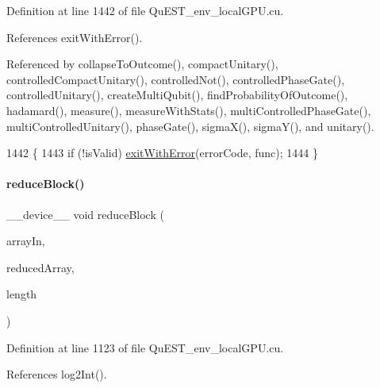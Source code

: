 Definition at line 1442 of file Qu\+E\+S\+T\+\_\+env\+\_\+local\+G\+P\+U.\+cu.



References exit\+With\+Error().



Referenced by collapse\+To\+Outcome(), compact\+Unitary(), controlled\+Compact\+Unitary(), controlled\+Not(), controlled\+Phase\+Gate(), controlled\+Unitary(), create\+Multi\+Qubit(), find\+Probability\+Of\+Outcome(), hadamard(), measure(), measure\+With\+Stats(), multi\+Controlled\+Phase\+Gate(), multi\+Controlled\+Unitary(), phase\+Gate(), sigma\+X(), sigma\+Y(), and unitary().


\begin{DoxyCode}
1442                                                               \{
1443     \textcolor{keywordflow}{if} (!isValid) \mbox{\hyperlink{QuEST__env__localGPU_8cu_ae5f9019826f35e8b51b1716cfe397b45}{exitWithError}}(errorCode, func);
1444 \}
\end{DoxyCode}
\mbox{\label{QuEST__env__localGPU_8cu_a4c740fa3ae25c71c1736790c674bdc98}} 
\paragraph{\texorpdfstring{reduce\+Block()}{reduceBlock()}}
{\footnotesize\ttfamily \+\_\+\+\_\+device\+\_\+\+\_\+ void reduce\+Block (\begin{DoxyParamCaption}\item[{\mbox{\hyperlink{QuEST__precision_8h_a4b654506f18b8bfd61ad2a29a7e38c25}{R\+E\+AL}} $\ast$}]{array\+In,  }\item[{\mbox{\hyperlink{QuEST__precision_8h_a4b654506f18b8bfd61ad2a29a7e38c25}{R\+E\+AL}} $\ast$}]{reduced\+Array,  }\item[{int}]{length }\end{DoxyParamCaption})}



Definition at line 1123 of file Qu\+E\+S\+T\+\_\+env\+\_\+local\+G\+P\+U.\+cu.



References log2\+Int().



